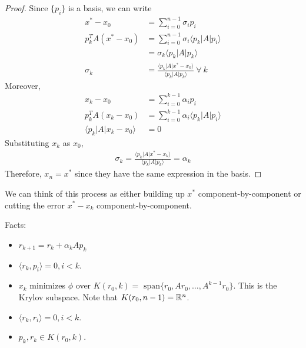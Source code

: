 \documentclass[class=article,crop=false]{standalone}
\begin{document}
\begin{proof}
Since $ \{ p_i\} $ is a basis, we can write
\begin{align*}
	x^* -x_0 &= \sum_{ i= 0}^{ n-1} \sigma_i p_i \\
	p_k^{T} A(x^* -x_0)&= \sum_{ i= 0}^{ n-1} \sigma_i \langle p_k|A|p_i \rangle \\
	&= \sigma_k \langle p_k|A|p_k \rangle \\
	\sigma_k &= \frac{\langle p_k|A|x^* -x_0 \rangle}{ \langle p_k|A|p_k \rangle} \ \forall \ k
\end{align*}
Moreover,
\begin{align*}
	x_k - x_0 &= \sum_{ i= 0}^{ k-1} \alpha_i p_i \\
	p_k^{T} A(x_k - x_0) &= \sum_{ i= 0}^{ k-1} \alpha_i \langle p_k|A|p_i \rangle \\
	\langle p_k|A|x_k-x_0 \rangle &= 0
\end{align*}
Substituting $ x_k $ as $ x_0$,
\begin{align*}
	\sigma_k = \frac{\langle p_k|A|x^* -x_k \rangle}{ \langle p_k|A|p_k \rangle} = \alpha_k
\end{align*}
Therefore, $ x_n = x^* $ since they have the same expression in the basis.
\end{proof}
\begin{remark}
We can think of this process as either building up $ x^* $ component-by-component or cutting the error  $ x^* -x_k$ component-by-component.
\end{remark}
Facts:
\begin{itemize}
	\item $ r_{k+1} = r_k + \alpha_k A p_k$ 
	\item $ \langle r_k, p_i \rangle=0, i<k$.
	\item $ x_k$ minimizes $ \phi$ over $ K(r_0,k) = \text{ span}\{r_0, A r_0,\ldots,A^{k-1} r_0\}  $. This is the Krylov subspace. Note that $ K(r_0,n-1) = \mathbb{R}^{n}$.
	\item $ \langle r_k,r_i \rangle=0, i<k$.
	\item $ p_k, r_k \in K(r_0,k)$.
\end{itemize}
\end{document}
